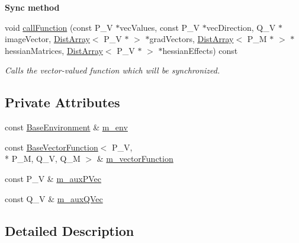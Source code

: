 \begin{Indent}{\bf Sync method}\par
\begin{DoxyCompactItemize}
\item 
void \hyperlink{class_q_u_e_s_o_1_1_vector_function_synchronizer_a2b6003017f08403e8c6c006027dbe240}{call\-Function} (const P\-\_\-\-V $\ast$vec\-Values, const P\-\_\-\-V $\ast$vec\-Direction, Q\-\_\-\-V $\ast$image\-Vector, \hyperlink{class_q_u_e_s_o_1_1_dist_array}{Dist\-Array}$<$ P\-\_\-\-V $\ast$ $>$ $\ast$grad\-Vectors, \hyperlink{class_q_u_e_s_o_1_1_dist_array}{Dist\-Array}$<$ P\-\_\-\-M $\ast$ $>$ $\ast$hessian\-Matrices, \hyperlink{class_q_u_e_s_o_1_1_dist_array}{Dist\-Array}$<$ P\-\_\-\-V $\ast$ $>$ $\ast$hessian\-Effects) const 
\begin{DoxyCompactList}\small\item\em Calls the vector-\/valued function which will be synchronized. \end{DoxyCompactList}\end{DoxyCompactItemize}
\end{Indent}
\subsection*{Private Attributes}
\begin{DoxyCompactItemize}
\item 
const \hyperlink{class_q_u_e_s_o_1_1_base_environment}{Base\-Environment} \& \hyperlink{class_q_u_e_s_o_1_1_vector_function_synchronizer_a36c2a9e1a2d317dddb5cf51b68e5c659}{m\-\_\-env}
\item 
const \hyperlink{class_q_u_e_s_o_1_1_base_vector_function}{Base\-Vector\-Function}$<$ P\-\_\-\-V, \\*
P\-\_\-\-M, Q\-\_\-\-V, Q\-\_\-\-M $>$ \& \hyperlink{class_q_u_e_s_o_1_1_vector_function_synchronizer_abde0efa4a6ab11898d8b0b0853d0971a}{m\-\_\-vector\-Function}
\item 
const P\-\_\-\-V \& \hyperlink{class_q_u_e_s_o_1_1_vector_function_synchronizer_af93da0ecec2b078ddacc8135f81cd996}{m\-\_\-aux\-P\-Vec}
\item 
const Q\-\_\-\-V \& \hyperlink{class_q_u_e_s_o_1_1_vector_function_synchronizer_a4fc0f69d67bfcfc200484bb741a2b75d}{m\-\_\-aux\-Q\-Vec}
\end{DoxyCompactItemize}


\subsection{Detailed Description}
